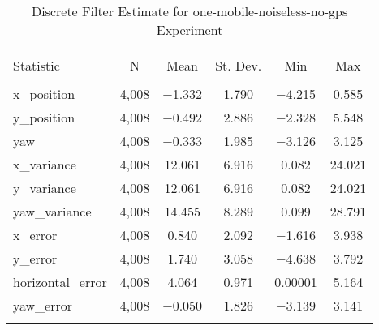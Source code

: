 
\begin{table}[h] \centering 
  \caption{Discrete Filter Estimate for one-mobile-noiseless-no-gps Experiment} 
  \label{tab:one_mobile_noiseless_no_gps_discrete_summary} 
\begin{tabular}{@{\extracolsep{5pt}}lccccc} 
\\[-1.8ex]\hline 
\hline \\[-1.8ex] 
Statistic & \multicolumn{1}{c}{N} & \multicolumn{1}{c}{Mean} & \multicolumn{1}{c}{St. Dev.} & \multicolumn{1}{c}{Min} & \multicolumn{1}{c}{Max} \\ 
\hline \\[-1.8ex] 
x\_position & 4,008 & $-$1.332 & 1.790 & $-$4.215 & 0.585 \\ 
y\_position & 4,008 & $-$0.492 & 2.886 & $-$2.328 & 5.548 \\ 
yaw & 4,008 & $-$0.333 & 1.985 & $-$3.126 & 3.125 \\ 
x\_variance & 4,008 & 12.061 & 6.916 & 0.082 & 24.021 \\ 
y\_variance & 4,008 & 12.061 & 6.916 & 0.082 & 24.021 \\ 
yaw\_variance & 4,008 & 14.455 & 8.289 & 0.099 & 28.791 \\ 
x\_error & 4,008 & 0.840 & 2.092 & $-$1.616 & 3.938 \\ 
y\_error & 4,008 & 1.740 & 3.058 & $-$4.638 & 3.792 \\ 
horizontal\_error & 4,008 & 4.064 & 0.971 & 0.00001 & 5.164 \\ 
yaw\_error & 4,008 & $-$0.050 & 1.826 & $-$3.139 & 3.141 \\ 
\hline \\[-1.8ex] 
\end{tabular} 
\end{table} 
